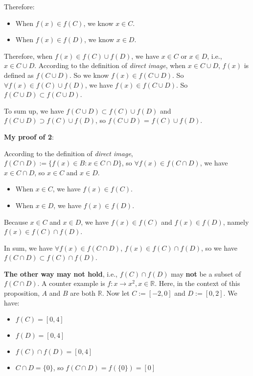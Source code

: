 \documentclass[12pt, letterpaper, oneside]{book}
\begin{document}
Therefore:
\begin{itemize}
  \item When $f(x) \in f(C)$, we know $x \in C$.
  \item When $f(x) \in f(D)$, we know $x \in D$.
\end{itemize}

Therefore, when $f(x) \in f(C) \cup f(D)$, we have $x \in C$ or $x \in D$, i.e.,
$x \in C \cup D$. According to the definition of \textit{direct image}, when $x
  \in C \cup D$, $f(x)$ is defined as $f(C \cup D)$. So we know $f(x) \in f(C
  \cup D)$. So $\forall f(x) \in f(C) \cup f(D)$, we have $f(x) \in f(C \cup D)$.
So $f(C \cup D) \subset f(C \cup D)$.

To sum up, we have $f(C \cup D) \subset f(C) \cup f(D)$ and $f(C \cup D)
  \supset f(C) \cup f(D)$, so $f(C \cup D)$ = $f(C) \cup f(D)$.

\textbf{My proof of 2}:

According to the definition of \textit{direct image}, $f(C \cap D) := \{f(x)
  \in B: x \in C \cap D\}$, so $\forall f(x) \in f(C \cap D)$, we have $x \in C
  \cap D$, so $x \in C$ and $x \in D$.

\begin{itemize}
  \item When $x \in C$, we have $f(x) \in f(C)$.
  \item When $x \in D$, we have $f(x) \in f(D)$.
\end{itemize}

Because $x \in C$ and $x \in D$, we have $f(x) \in f(C)$ and $f(x) \in f(D)$,
namely $f(x) \in f(C) \cap f(D)$.

In sum, we have $\forall f(x) \in f(C \cap D)$, $f(x) \in f(C) \cap f(D)$, so
we have $f(C \cap D) \subset f(C) \cap f(D)$.

\textbf{The other way may not hold}, i.e., $f(C) \cap f(D)$ may \textbf{not} be
a subset of $f(C \cap D)$. A counter example is $f: x \rightarrow x^2, x \in
  \mathbb{R}$. Here, in the context of this proposition, $A$ and $B$ are both
$\mathbb{R}$. Now let $C := [-2, 0]$ and $D := [0, 2]$. We have:

\begin{itemize}
  \item $f(C) = [0, 4]$
  \item $f(D) = [0, 4]$
  \item $f(C) \cap f(D) = [0, 4]$
  \item $C \cap D = \{0\}$, so $f(C \cap D) = f(\{0\}) = [0]$
\end{itemize}
\end{document}
